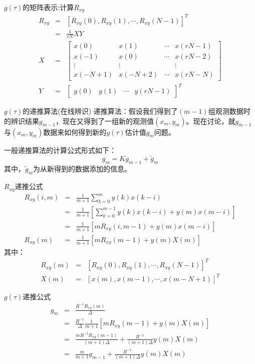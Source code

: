 \begin{frame}{$g(\tau)$的矩阵表示:计算$R_{xy}$}
\begin{eqnarray*}
R_{xy} &=& [R_{xy}(0),R_{xy}(1),\cdots,R_{xy}(N-1)]^T \\
&=&  \frac{1}{rN}XY \\
X&=&
\begin{bmatrix}
x(0) & x(1) & \cdots & x(rN-1) \\
x(-1) & x(0) & \cdots & x(rN-2) \\
\vdots & \vdots &  & \vdots \\
x(-N+1) & x(-N+2) & \cdots & x(rN-N) 
\end{bmatrix}\\
Y &=& \begin{bmatrix} y(0) & y(1) &\cdots & y(rN-1) \end{bmatrix}^T
\end{eqnarray*}
\end{frame}
\begin{frame}{$g(\tau)$的递推算法(在线辨识)}
递推算法：假设我们得到了$(m-1)$组观测数据时的辨识结果$g_{m-1}$，现在又得到了一组新的观测值$(x_m,y_m)$。现在讨论，就$g_{m-1}$与$(x_m,y_m)$数据来如何得到新的$g(\tau)$估计值$g_m$问题。

一般递推算法的计算公式形式如下：
$$
g_m = K g_{m-1} + \tilde{g}_m
$$
其中，$\tilde{g}_m$为从新得到的数据添加的信息。
\end{frame}

\begin{frame}{$R_{xy}$递推公式}
\begin{eqnarray*}
R_{xy}(i,m) &=& \frac{1}{m+1}\sum_{k=0}^m y(k)x(k-i) \\
&=& \frac{1}{m+1}\left[\sum_{k=0}^{m-1} y(k)x(k-i)+y(m)x(m-i)\right] \\
&=& \frac{1}{m+1}\left[mR_{xy}(i,m-1)+y(m)x(m-i)\right] \\
R_{xy}(m)&=& \frac{1}{m+1}\left[mR_{xy}(m-1)+y(m)X(m)\right] %
\end{eqnarray*}
其中：
\begin{eqnarray*}
R_{xy}(m) &=& [R_{xy}(0), R_{xy}(1), \cdots, R_{xy}(N-1)]^T \\
X(m) &=& [x(m),x(m-1),\cdots,x(m-N+1)]^T
\end{eqnarray*}
\end{frame}

\begin{frame}{$g(\tau)$递推公式}
\begin{eqnarray*}
g_m &=& \frac{R^{-1}R_{xy}(m)}{\Delta} \\
&=& \frac{R^{-1}}{\Delta}\frac{1}{m+1}\left[mR_{xy}(m-1)+y(m)X(m)\right] \\
&=& \frac{mR^{-1}R_{xy}(m-1)}{(m+1)\Delta}+\frac{R^{-1}}{(m+1)\Delta}y(m)X(m) \\
&=& \frac{m}{m+1}g_{m-1}+\frac{R^{-1}}{(m+1)\Delta}y(m)X(m) %
\end{eqnarray*}
\end{frame}

